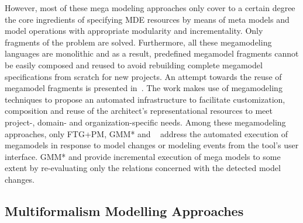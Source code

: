 However, most of these mega modeling approaches only cover to a certain degree
the core ingredients of specifying MDE resources by means of meta models and
model operations with appropriate modularity and incrementality. Only fragments
of the problem are solved. Furthermore, all these megamodeling languages are
monolithic and as a result, predefined megamodel fragments cannot be easily
composed and reused to avoid
rebuilding complete megamodel specifications from scratch  for new projects. An attempt towards the reuse of megamodel fragments is presented in~\cite{Hilliard2012,Hilliard2010}. 
The work makes use of megamodeling techniques to propose an automated infrastructure to facilitate customization, composition and reuse of the architect's representational resources to meet project-, domain- and organization-specific needs.
Among these megamodeling approaches, only FTG+PM, GMM* and ~\cite{SNG10, SHG12}
address the automated execution of megamodels in response to model changes or
modeling events from the tool's user interface. GMM* and \cite{SNG10,
SHG12} provide incremental execution of mega models to some extent by
re-evaluating only the relations concerned with the detected model changes.


% 
\subsection{Multiformalism Modelling Approaches}

